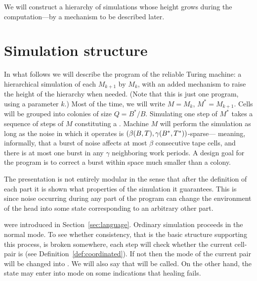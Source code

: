 \documentclass[11pt]{memoir}
\theoremstyle{definition} %
\newcommand{\rul}[1]{\ensuremath{\texttt{#1}}}
\def\B{B}
\newcommand{\Q}{Q} %
\newcommand{\Tu}{T}
\newcommand{\Tus}{T^{*}}
\newcommand{\Comp}{\rul{Compute}}
\newcommand{\Transfer}{\rul{Transfer}}
\begin{document}
We will construct a hierarchy of simulations whose height grows during the
computation---by a mechanism to be described later.


\section{Simulation structure}\label{sec:sim-struc}

In what follows we will describe the program of the reliable Turing machine:
a hierarchical simulation of each \( M_{k+1} \) by \( M_{k} \), with an added mechanism to
raise the height of the hierarchy when needed.
(Note that this is just one program, using a parameter \( k \).)
Most of the time, we will write \( M=M_{k} \),  \( M^{*}=M_{k+1} \).
Cells will be grouped into colonies of size \( \Q=\B^{*}/\B \).
Simulating one step of \( M^{*} \) takes a sequence of steps of \( M \)
constituting a .
Machine \( M \) will perform the simulation as long as the noise
in which it operates is \( (\beta\pair{\B}{\Tu}, \gamma\pair{\B^{*}}{\Tus}) \)-sparse---
meaning, informally, that a burst of noise affects at most \( \beta \) consecutive tape cells,  
and there is at most one burst in any \( \gamma \)  neighboring work periods.
A design goal for the program is to
correct a burst within space much smaller than a colony.

The presentation is not entirely
modular in the sense that after the definition of each part it is shown
what properties of the simulation it guarantees.
This is since noise occurring during any part of the program
can change the environment of the head into
some state corresponding to an arbitrary other part.

 were introduced in Section~\ref{sec:language}.
Ordinary simulation proceeds in the normal mode. 
To see whether consistency, that is the basic structure
supporting this process, is broken somewhere, each step will check 
whether the current cell-pair is 
(see Definition~\ref{def:coordinated}).
If not then the mode of the current pair will be changed into .
We will also say that  will be called.
On the other hand, the state may enter into  mode on some indications that
healing fails.

\end{document}
